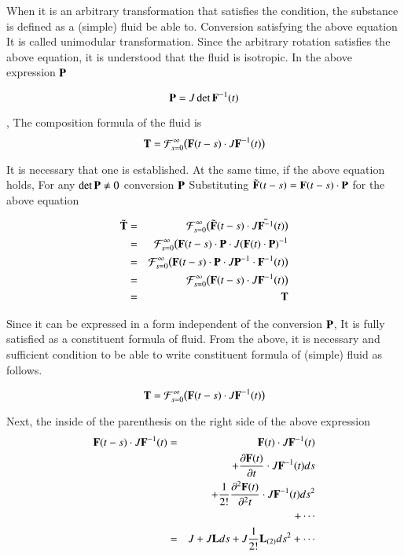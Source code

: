 When it is an arbitrary transformation that satisfies the condition, the substance is defined as a (simple) fluid
be able to. Conversion satisfying the above equation
It is called unimodular transformation.
Since the arbitrary rotation satisfies the above equation, it is understood that the fluid is isotropic.
In the above expression $\mathbf{P}$

\begin{equation}
{\mathbf{P}}=J\det{\mathbf{F}^{-1}}(t)
\end{equation}

, The composition formula of the fluid is
\begin{equation}
{\mathbf{T}}=\mathcal{F}_{s=0}^{\infty}\big({\mathbf{F}}(t-s) \cdot J {\mathbf{F}^{-1}}(t)\big)
\end{equation}

It is necessary that one is established. At the same time, if the above equation holds,
For any $\det{\mathbf{P}}\neq0$ conversion $\mathbf{P}$
Substituting $\tilde{\mathbf{F}}(t-s)={\mathbf{F}}(t-s)\cdot{\mathbf{P}}$ for the above equation

\begin{eqnarray}
\tilde{\mathbf{T}}
&=&\mathcal{F}_{s=0}^{\infty}\big(\tilde{\mathbf{F}}(t-s) \cdot J \tilde{\mathbf{F}^{-1}}(t)\big)\\  							&=&\mathcal{F}_{s=0}^{\infty}\big({\mathbf{F}}(t-s)\cdot{\mathbf{P}} \cdot J ({\mathbf{F}}(t)\cdot{\mathbf{P}})^{-1}\\  				&=&\mathcal{F}_{s=0}^{\infty}\big({\mathbf{F}}(t-s)\cdot{\mathbf{P}} \cdot J {\mathbf{P}^{-1}} \cdot {\mathbf{F}^{-1}}(t)\big)\\  		&=&\mathcal{F}_{s=0}^{\infty}\big({\mathbf{F}}(t-s) \cdot J {\mathbf{F}^{-1}}(t)\big)\\
&=&{\mathbf{T}}
\end{eqnarray}

Since it can be expressed in a form independent of the conversion $\mathbf{P}$,
It is fully satisfied as a constituent formula of fluid.
From the above, it is necessary and sufficient condition to be able to write constituent formula of (simple) fluid as follows.

\begin{equation}
{\mathbf{T}}=\mathcal{F}_{s=0}^{\infty}\big({\mathbf{F}}(t-s) \cdot J {\mathbf{F}^{-1}}(t)\big)
\end{equation}

Next, the inside of the parenthesis on the right side of the above expression
\begin{eqnarray}
{\mathbf{F}}(t-s) \cdot J {\mathbf{F}^{-1}}(t)
&=&  {\mathbf{F}}(t) \cdot J {\mathbf{F}^{-1}}(t)\\
	&&+ \frac{\partial{\mathbf{F}}(t)}{\partial t} \cdot J {\mathbf{F}^{-1}}(t) ds\\
	&&+ \frac{1}{2!}\frac{\partial^2{\mathbf{F}}(t)}{\partial^2t} \cdot J{\mathbf{F}^{-1}}(t)ds^2\\
	&&+ \cdots\\
	&=&  J + J {\mathbf{L}} ds + J \frac{1}{2!} {\mathbf{L}_{(2)}}  ds^2 + \cdots
\end{eqnarray}

